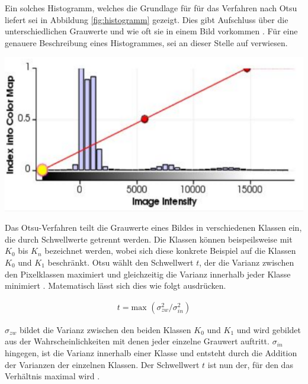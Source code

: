 \begin{minipage}{0.40\textwidth}
	Ein solches Histogramm, welches die Grundlage für für das Verfahren nach Otsu
	liefert sei in Abbildung \ref{fig:histogramm} gezeigt. Dies gibt Aufschluss über
	die unterschiedlichen Grauwerte und wie oft sie in einem Bild vorkommen \citep[vgl.][Seite264]{lehmann2013bildverarbeitung}.
	Für eine genauere Beschreibung eines Histogrammes, sei an dieser Stelle auf \citet[Seite42]{burger2009}
	verwiesen.
\end{minipage}
\hfill
\begin{minipage}{0.50\textwidth}
	\centering
	\includegraphics[width=1\textwidth]{img/histogramm.jpg}
	 \label{fig:histogramm}
\end{minipage}

Das Otsu-Verfahren teilt die Grauwerte eines Bildes in verschiedenen Klassen ein,
die durch Schwellwerte getrennt werden. Die Klassen können beispeilsweise mit
$K_{0}$ bis $K_{n}$ bezeichnet werden, wobei sich diese konkrete Beispiel auf die
Klassen $K_{0}$ und $K_{1}$ beschränkt. Otsu wählt den Schwellwert $t$, der die Varianz
zwischen den Pixelklassen maximiert und gleichzeitig die Varianz innerhalb jeder
Klasse minimiert \citep[vgl.][Seite264]{lehmann2013bildverarbeitung}.
Matematisch lässt sich dies wie folgt ausdrücken.

\begin{align}
	t = \text{max }(\sigma_{zw}^{2}/ \sigma_{in}^{2})
\end{align}

$\sigma_{zw}$ bildet die Varianz zwischen den beiden Klassen $K_{0}$ und $K_{1}$
und wird gebildet aus der Wahrscheinlichkeiten mit denen jeder einzelne Grauwert
auftritt. $\sigma_{in}$ hingegen, ist die Varianz innerhalb einer Klasse und entsteht
durch die Addition der Varianzen der einzelnen Klassen. Der Schwellwert $t$ ist
nun der, für den das Verhältnis maximal wird \citep[vgl.][Seite264]{lehmann2013bildverarbeitung}.

